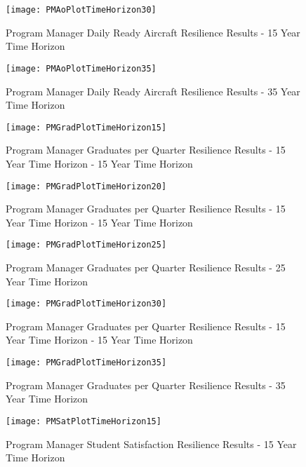 \begin{figure}[h]
  \centering\texttt{[image: PMAoPlotTimeHorizon30]}
  \caption{Program Manager Daily Ready Aircraft Resilience Results - 15 Year Time Horizon}
  \label{f:PMresultsAo30}
\end{figure}

\begin{figure}[h]
  \centering\texttt{[image: PMAoPlotTimeHorizon35]}
  \caption{Program Manager Daily Ready Aircraft Resilience Results - 35 Year Time Horizon}
  \label{f:PMresultsAo35}
\end{figure}


\begin{figure}[h]
  \centering\texttt{[image: PMGradPlotTimeHorizon15]}
  \caption{Program Manager Graduates per Quarter Resilience Results - 15 Year Time Horizon - 15 Year Time Horizon}
  \label{f:PMresultsGrad15}
\end{figure}

\begin{figure}[h]
  \centering\texttt{[image: PMGradPlotTimeHorizon20]}
  \caption{Program Manager Graduates per Quarter Resilience Results - 15 Year Time Horizon - 15 Year Time Horizon}
  \label{f:PMresultsGrad20}
\end{figure}


\begin{figure}[h]
  \centering\texttt{[image: PMGradPlotTimeHorizon25]}
  \caption{Program Manager Graduates per Quarter Resilience Results - 25 Year Time Horizon}
  \label{f:PMresultsGrad25}
\end{figure}

\begin{figure}[h]
  \centering\texttt{[image: PMGradPlotTimeHorizon30]}
  \caption{Program Manager Graduates per Quarter Resilience Results - 15 Year Time Horizon - 15 Year Time Horizon}
  \label{f:PMresultsGrad30}
\end{figure}


\begin{figure}[h]
  \centering\texttt{[image: PMGradPlotTimeHorizon35]}
  \caption{Program Manager Graduates per Quarter Resilience Results - 35 Year Time Horizon}
  \label{f:PMresultsGrad35}
\end{figure}

\begin{figure}[h]
  \centering\texttt{[image: PMSatPlotTimeHorizon15]}
  \caption{Program Manager Student Satisfaction Resilience Results - 15 Year Time Horizon}
  \label{f:PMresultsSat15}
\end{figure}

